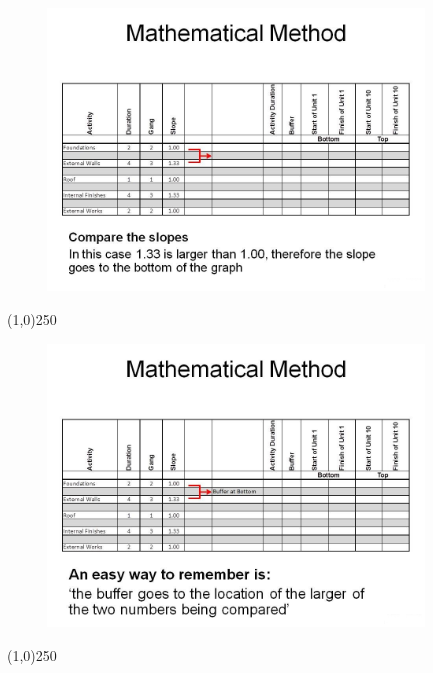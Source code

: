 \begin{frame}
\begin{figure}
	\centering
		\includegraphics[width = 10.0cm]{oldnotes/Slide273.jpg}
\end{figure}
\end{frame}
\begin{center}\line(1,0){250}\end{center}






\begin{frame}
\begin{figure}
	\centering
		\includegraphics[width = 10.0cm]{oldnotes/Slide274.jpg}
\end{figure}
\end{frame}
\begin{center}\line(1,0){250}\end{center}






